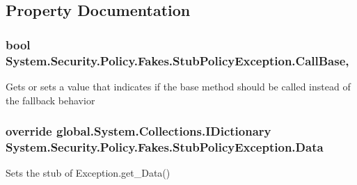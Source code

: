 \subsection{Property Documentation}
\hypertarget{class_system_1_1_security_1_1_policy_1_1_fakes_1_1_stub_policy_exception_afedfe6a319e0510a0991cca3158594fa}{
\subsubsection[{Call\-Base}]{\setlength{\rightskip}{0pt plus 5cm}bool System.\-Security.\-Policy.\-Fakes.\-Stub\-Policy\-Exception.\-Call\-Base\hspace{0.3cm}{\ttfamily [get]}, {\ttfamily [set]}}}\label{class_system_1_1_security_1_1_policy_1_1_fakes_1_1_stub_policy_exception_afedfe6a319e0510a0991cca3158594fa}


Gets or sets a value that indicates if the base method should be called instead of the fallback behavior

\hypertarget{class_system_1_1_security_1_1_policy_1_1_fakes_1_1_stub_policy_exception_a4d22dc58ff62712c1470897dc6669720}{
\subsubsection[{Data}]{\setlength{\rightskip}{0pt plus 5cm}override global.\-System.\-Collections.\-I\-Dictionary System.\-Security.\-Policy.\-Fakes.\-Stub\-Policy\-Exception.\-Data\hspace{0.3cm}{\ttfamily [get]}}}\label{class_system_1_1_security_1_1_policy_1_1_fakes_1_1_stub_policy_exception_a4d22dc58ff62712c1470897dc6669720}


Sets the stub of Exception.\-get\-\_\-\-Data()


